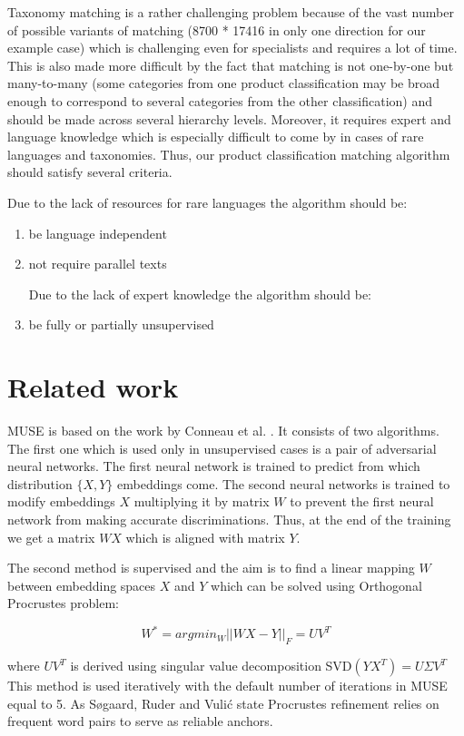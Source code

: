 \documentclass[11pt,a4paper]{article}
\begin{document}
Taxonomy matching is a rather challenging problem because of the vast number of possible variants of matching (8700 * 17416 in only one direction for our example case) which is challenging even for specialists and requires a lot of time. This is also made more difficult by the fact that matching is not one-by-one but many-to-many (some categories from one product classification may be broad enough to correspond to several categories from the other classification) and should be made across several hierarchy levels. Moreover, it requires expert and language knowledge which is especially difficult to come by in cases of rare languages and taxonomies. Thus, our product classification matching algorithm should satisfy several criteria.

Due to the lack of resources for rare languages	the algorithm should be:
\begin{enumerate}
	
	\item be language independent
	
	\item not require parallel texts
	
	
	Due to the lack of expert knowledge the algorithm should be:
	
	\item be fully or partially unsupervised
\end{enumerate}
\section{Related work}

MUSE is based on the work by Conneau et al. \cite{muse}. It consists of two algorithms. The first one which is used only in unsupervised cases is a pair of adversarial neural networks. The first neural network is trained to predict from which distribution $\{X, Y\}$ embeddings come. The second neural networks is trained to modify embeddings $X$ multiplying it by matrix $W$ to prevent the first neural network from making accurate discriminations. Thus, at the end of the training we get a matrix $WX$ which is aligned with matrix $Y$.

The second method is supervised and the aim is to find a linear mapping $W$ between embedding spaces $X$ and $Y$ which can be solved using Orthogonal Procrustes problem:

$$ W^* = argmin_W ||WX - Y||_F = UV^T$$

where $UV^T$ is derived using singular value decomposition SVD$(YX^T) = U \Sigma V^T$
This method is used iteratively with the default number of iterations in MUSE equal to 5. As Søgaard, Ruder and Vulić state Procrustes refinement relies on frequent word pairs to serve as reliable anchors.
\end{document}
